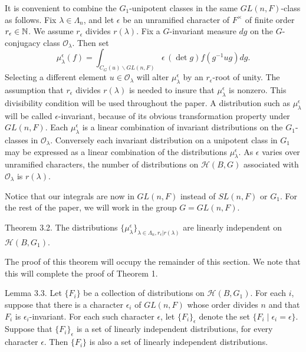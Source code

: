 \documentclass{amsart}
\begin{document}
It is convenient to combine the $G_1$-unipotent classes in 
  the same $GL(n,F)$-class as follows.
Fix
  $ \lambda \in \Lambda_n $,
and let
  $ \epsilon $
be an unramified character of $F^\times$ 
of finite order
  $ r_{\epsilon} \in {\Bbb N}$.
We assume
  $ r_{\epsilon} $
divides
  $ r(\lambda) $.
Fix a $G$-invariant measure $dg$
on the $G$-conjugacy class
  $ {\mathcal O}_{\lambda} $.
Then set
%
$$
  \mu_{\lambda}^{\epsilon} (f) =
  \int_{ C_G (u) \backslash GL(n,F) }
  \epsilon \, (\det g) f
  (g^{-1} ug)dg.
$$
%
Selecting a different element
 $ u \in {\mathcal O}_{\lambda} $
will alter
  $ \mu_{\lambda}^{\epsilon} $
by an
  $ r_{\epsilon}$-root of unity.
The assumption that
  $ r_{\epsilon} $
divides
  $ r(\lambda) $
is needed to insure that
  $ \mu_{\lambda}^{\epsilon} $
is nonzero. 
This divisibility condition will be used throughout the paper.  A
distribution such as $\mu^\epsilon_\lambda$ will be called
$\epsilon$-invariant, because of its obvious transformation
property under $GL(n,F)$.
Each
  $ \mu_{\lambda}^{\epsilon} $
is a linear combination of invariant distributions
  on the $G_1$-classes in
  $ {\mathcal O}_{\lambda} $.
Conversely each invariant distribution on a unipotent class in $G_1$ 
may be expressed as a linear combination of the distributions
  $ \mu_{\lambda}^{\epsilon} $.
As 
   $ \epsilon $
varies over unramified characters, the number of
  distributions on
  $ {\mathcal H}(B, G)  $ associated with ${\mathcal O}_\lambda$ is $r(\lambda)$.

Notice that our integrals are now in 
  $ GL (n,F) $
instead of
  $ SL(n,F)  $ or $G_1$.
For the rest of the paper, we will work in the group
  $ G = GL (n,F) $.

\proclaim Theorem {3.2}.
The distributions
  $ \bigl\{
      \mu_{\lambda}^{\epsilon} 
    \bigr\}_{\lambda \in 
             \Lambda_n ,
             r_{\epsilon}
            |r(\lambda) } $
are linearly independent on \linebreak
  $ {\mathcal H}(B, G_1) $.
\finishproclaim

The proof of this theorem will occupy the remainder of this section.
We note that this will complete the proof of Theorem 1.

\proclaim Lemma {3.3}.
Let $\{F_i\}$ be a collection of distributions on ${\mathcal H}(B,G_1)$.
For each $i$,
suppose that there is a character $\epsilon_i$ of
$GL(n,F)$ whose order divides $n$ and that $F_i$ is $\epsilon_i$-invariant.  For each
such character $\epsilon$, let $\{F_i\}_\epsilon$ denote the
set $\{F_i\mid \epsilon_i=\epsilon\}$.  Suppose that
$\{F_i\}_\epsilon$ is a set of linearly independent distributions,
for every character $\epsilon$.  Then $\{F_i\}$ is also a set
of linearly
independent distributions.
\finishproclaim
\end{document}
